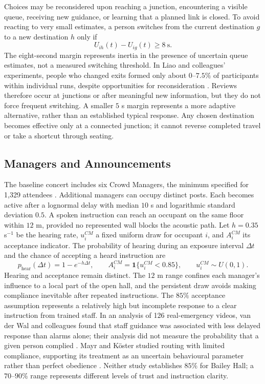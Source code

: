 \documentclass[11pt,a4paper]{article}
\newcommand{\ind}{\mathbf{1}}
\begin{document}
Choices may be reconsidered upon reaching a junction, encountering a visible queue, receiving new guidance, or learning that a planned link is closed. To avoid reacting to very small estimates, a person switches from the current destination $g$ to a new destination $h$ only if
\begin{equation}\label{eq:review}
U_{ih}(t)-U_{ig}(t)\geq8\ \mathrm{s}.
\end{equation}
The eight-second margin represents inertia in the presence of uncertain queue estimates, not a measured switching threshold. In Liao and colleagues' experiments, people who changed exits formed only about $0$--$7.5\%$ of participants within individual runs, despite opportunities for reconsideration \cite{liao}. Reviews therefore occur at junctions or after meaningful new information, but they do not force frequent switching. A smaller $5$ s margin represents a more adaptive alternative, rather than an established typical response. Any chosen destination becomes effective only at a connected junction; it cannot reverse completed travel or take a shortcut through seating.

\subsection{Managers and Announcements}

The baseline concert includes six Crowd Managers, the minimum specified for 1,329 attendees \cite{brief}. Additional managers can occupy distinct posts. Each becomes active after a lognormal delay with median $10$ s and logarithmic standard deviation $0.5$. A spoken instruction can reach an occupant on the same floor within $12$ m, provided no represented wall blocks the acoustic path. Let $h=0.35$ s$^{-1}$ be the hearing rate, $u_i^{CM}$ a fixed uniform draw for occupant $i$, and $A_i^{CM}$ its acceptance indicator. The probability of hearing during an exposure interval $\Delta t$ and the chance of accepting a heard instruction are
\begin{equation}\label{eq:manager}
p_{\mathrm{hear}}(\Delta t)=1-e^{-h\Delta t},\qquad
A_i^{CM}=\ind\{u_i^{CM}<0.85\},\qquad u_i^{CM}\sim U(0,1).
\end{equation}
Hearing and acceptance remain distinct. The $12$ m range confines each manager's influence to a local part of the open hall, and the persistent draw avoids making compliance inevitable after repeated instructions. The $85\%$ acceptance assumption represents a relatively high but incomplete response to a clear instruction from trained staff. In an analysis of 126 real-emergency videos, van der Wal and colleagues found that staff guidance was associated with less delayed response than alarms alone; their analysis did not measure the probability that a given person complied \cite{vanderwal}. Mayr and K\"oster studied routing with limited compliance, supporting its treatment as an uncertain behavioural parameter rather than perfect obedience \cite{mayr}. Neither study establishes $85\%$ for Bailey Hall; a $70$--$90\%$ range represents different levels of trust and instruction clarity.
\end{document}
